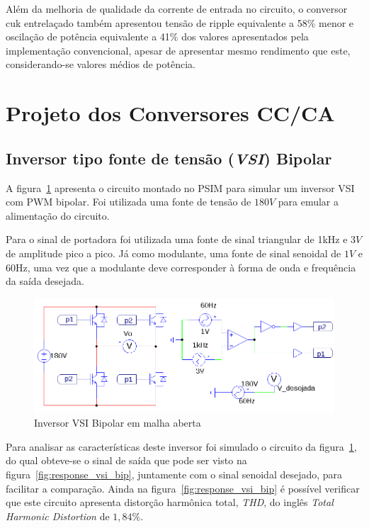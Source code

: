 \documentclass[
	12pt,				%
	openany,
	onseside,
	a4paper,			%
	english,			%
	french,				%
	spanish,			%
	brazil,				%
	]{abntex2}
\begin{document}
Além da melhoria de qualidade da corrente de entrada no circuito, o conversor cuk entrelaçado também apresentou tensão de ripple equivalente a 58\% menor e oscilação de potência equivalente a 41\% dos valores apresentados pela implementação convencional, apesar de apresentar mesmo rendimento que este, considerando-se valores médios de potência.

\section{Projeto dos Conversores CC/CA} \label{sec:met_conv_cc_ca}

\subsection{Inversor tipo fonte de tensão (\textit{VSI}) Bipolar}

A figura~\ref{fig:VSI_bip_circ} apresenta o circuito montado no PSIM para simular um inversor VSI com PWM bipolar. Foi utilizada uma fonte de tensão de $180V$ para emular a alimentação do circuito.

Para o sinal de portadora foi utilizada uma fonte de sinal triangular de 1kHz e $3V$ de amplitude pico a pico. Já como modulante, uma fonte de sinal senoidal de $1V$ e 60Hz, uma vez que a modulante deve corresponder à forma de onda e frequência da saída desejada.

\begin{figure}[htpb]%
	\centering%
		\includegraphics[width=0.8 \linewidth]{vsi_bipolar_psim_circ}
		\caption{Inversor VSI Bipolar em malha aberta}
		\label{fig:VSI_bip_circ}
\end{figure}

Para analisar as características deste inversor foi simulado o circuito da figura~\ref{fig:VSI_bip_circ}, do qual obteve-se o sinal de saída que pode ser visto na figura~\ref{fig:response_vsi_bip}, juntamente com o sinal senoidal desejado, para facilitar a comparação. Ainda na figura~\ref{fig:response_vsi_bip} é possível verificar que este circuito apresenta distorção harmônica total, \emph{THD}, do inglês \textit{Total Harmonic Distortion} de $1,84\%$.
\end{document}
